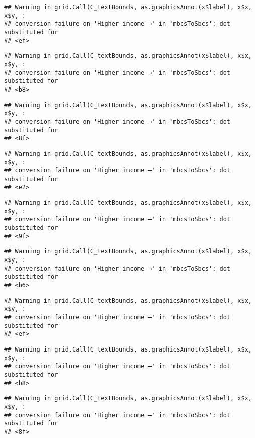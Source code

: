 \documentclass[
]{article}
\begin{document}
\begin{verbatim}
## Warning in grid.Call(C_textBounds, as.graphicsAnnot(x$label), x$x, x$y, :
## conversion failure on 'Higher income ⟶️' in 'mbcsToSbcs': dot substituted for
## <ef>
\end{verbatim}

\begin{verbatim}
## Warning in grid.Call(C_textBounds, as.graphicsAnnot(x$label), x$x, x$y, :
## conversion failure on 'Higher income ⟶️' in 'mbcsToSbcs': dot substituted for
## <b8>
\end{verbatim}

\begin{verbatim}
## Warning in grid.Call(C_textBounds, as.graphicsAnnot(x$label), x$x, x$y, :
## conversion failure on 'Higher income ⟶️' in 'mbcsToSbcs': dot substituted for
## <8f>
\end{verbatim}

\begin{verbatim}
## Warning in grid.Call(C_textBounds, as.graphicsAnnot(x$label), x$x, x$y, :
## conversion failure on 'Higher income ⟶️' in 'mbcsToSbcs': dot substituted for
## <e2>
\end{verbatim}

\begin{verbatim}
## Warning in grid.Call(C_textBounds, as.graphicsAnnot(x$label), x$x, x$y, :
## conversion failure on 'Higher income ⟶️' in 'mbcsToSbcs': dot substituted for
## <9f>
\end{verbatim}

\begin{verbatim}
## Warning in grid.Call(C_textBounds, as.graphicsAnnot(x$label), x$x, x$y, :
## conversion failure on 'Higher income ⟶️' in 'mbcsToSbcs': dot substituted for
## <b6>
\end{verbatim}

\begin{verbatim}
## Warning in grid.Call(C_textBounds, as.graphicsAnnot(x$label), x$x, x$y, :
## conversion failure on 'Higher income ⟶️' in 'mbcsToSbcs': dot substituted for
## <ef>
\end{verbatim}

\begin{verbatim}
## Warning in grid.Call(C_textBounds, as.graphicsAnnot(x$label), x$x, x$y, :
## conversion failure on 'Higher income ⟶️' in 'mbcsToSbcs': dot substituted for
## <b8>
\end{verbatim}

\begin{verbatim}
## Warning in grid.Call(C_textBounds, as.graphicsAnnot(x$label), x$x, x$y, :
## conversion failure on 'Higher income ⟶️' in 'mbcsToSbcs': dot substituted for
## <8f>
\end{verbatim}
\end{document}
